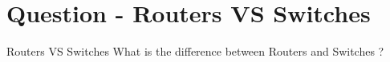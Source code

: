 \section{Question - Routers VS Switches}

\begin{questionBox}{Routers VS Switches}
    What is the difference between Routers and Switches ?
\end{questionBox}
